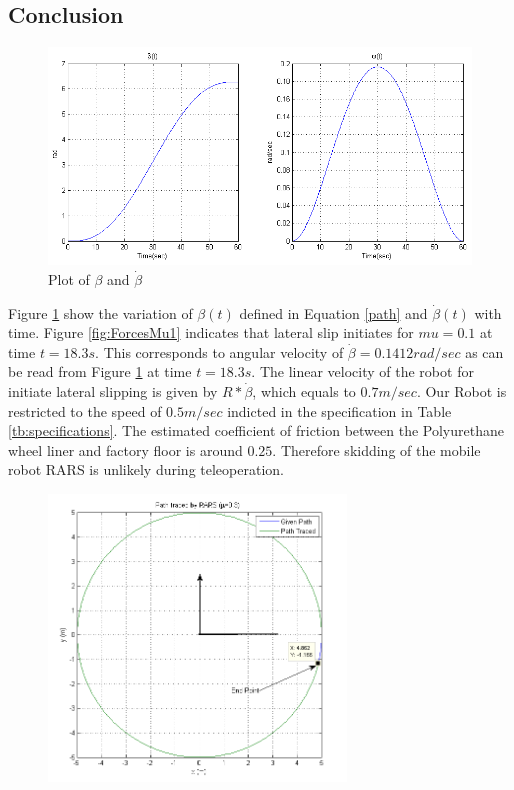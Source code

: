 {\subsection{Conclusion}
\begin{figure}
	\label{fig:beta}	
	\includegraphics[width=\textwidth]{Chapter4/fig/beta}	
	\caption{Plot of $\beta$ and $\dot{\beta}$}
\end{figure}
Figure \ref{fig:beta} show the variation of $\beta(t)$ defined in Equation \ref{path} and $\dot\beta(t)$ with time.  Figure \ref{fig:ForcesMu1} indicates  that lateral slip initiates for $mu=0.1$ at time $t=18.3s$. This corresponds to angular velocity of $ \dot \beta =0.1412 rad/sec$ as can be read from Figure \ref{fig:beta} at time $t=18.3s$.
The linear velocity of the robot for initiate lateral slipping is given by $R*\dot{\beta}$, which equals to $0.7m/sec$. Our Robot is restricted to the speed of $0.5m/sec$ indicted in the specification in Table \ref{tb:specifications}. The estimated coefficient of friction between the Polyurethane wheel liner and factory floor is around $0.25$. Therefore skidding of the mobile robot RARS is unlikely during teleoperation. 
\begin{figure}
	\begin{minipage}[t]{0.5\textwidth}
		\centering
		\includegraphics[height=3in]{Chapter4/fig/PathWithMu-3slip}

\end{minipage}
\end{figure}}
